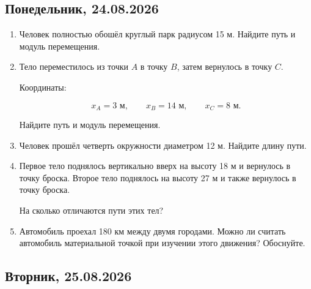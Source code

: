 \documentclass[a4paper,12pt]{article}
\begin{document}

\subsection*{\textcolor{darkaccent}{Понедельник, 24.08.2026}}

\begin{enumerate}[label=\arabic*.]

\item
Человек полностью обошёл круглый парк
радиусом 15 м.
Найдите путь и модуль перемещения.

\item
Тело переместилось из точки $A$ в точку $B$,
затем вернулось в точку $C$.

Координаты:

\[
x_A=3\text{ м},
\qquad
x_B=14\text{ м},
\qquad
x_C=8\text{ м}.
\]

Найдите путь и модуль перемещения.

\item
Человек прошёл четверть окружности
диаметром 12 м.
Найдите длину пути.

\item
Первое тело поднялось вертикально вверх
на высоту 18 м и вернулось в точку броска.
Второе тело поднялось на высоту 27 м
и также вернулось в точку броска.

На сколько отличаются пути этих тел?

\item
Автомобиль проехал 180 км между двумя городами.
Можно ли считать автомобиль материальной точкой
при изучении этого движения?
Обоснуйте.

\end{enumerate}


\subsection*{\textcolor{darkaccent}{Вторник, 25.08.2026}}
\end{document}
